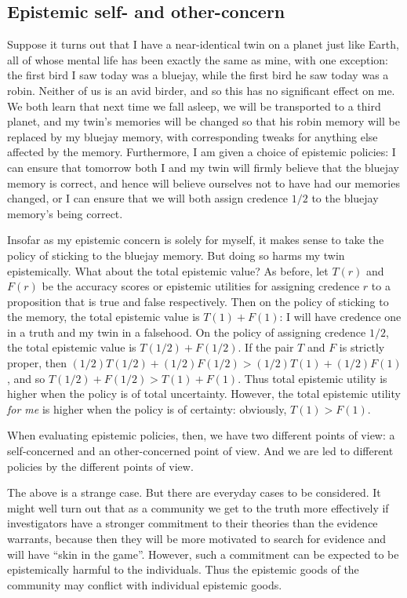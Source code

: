 \subsection{Epistemic self- and other-concern}
Suppose it turns out that I have a near-identical twin on a planet just like Earth, all of whose mental life has been exactly 
the same as mine, with one exception: the first bird I saw today was a bluejay, while the first bird he saw today was a robin. 
Neither of us is an avid birder, and so this has no significant effect on me. We both learn that next time we fall asleep, we 
will be transported to a third planet, and my twin's memories will be changed so that his robin memory will be replaced by my
bluejay memory, with corresponding tweaks for anything else affected by the memory. Furthermore, I am given a choice of epistemic
policies: I can ensure that tomorrow both I and my twin will firmly believe that the bluejay memory is correct, and hence will 
believe ourselves not to have had our memories changed, or I can ensure that we will both assign credence $1/2$ to the bluejay 
memory's being correct. 

Insofar as my epistemic concern is solely for myself, it makes sense to take the policy of sticking to the bluejay memory.
But doing so harms my twin epistemically. What about the total epistemic value? As before, let $T(r)$ and $F(r)$ be the accuracy 
scores or epistemic utilities for assigning credence $r$ to a proposition that is true and false respectively. Then on the policy 
of sticking to the memory, the total epistemic value is $T(1)+F(1)$: I will have credence one in a truth and my twin in a falsehood.
On the policy of assigning credence $1/2$, the total epistemic value is $T(1/2)+F(1/2)$. If the pair $T$ and $F$ is strictly proper,
then $(1/2)T(1/2)+(1/2)F(1/2) > (1/2)T(1)+(1/2)F(1)$, and so $T(1/2)+F(1/2)>T(1)+F(1)$. Thus total epistemic utility is higher
when the policy is of total uncertainty. However, the total epistemic utility \textit{for me} is higher when the policy is of
certainty: obviously, $T(1)>F(1)$. 

When evaluating epistemic policies, then, we have two different points of view: a self-concerned and an other-concerned 
point of view. And we are led to different policies by the different points of view.

The above is a strange case. But there are everyday cases to be considered. It might well turn out that as a community we 
get to the truth more effectively if investigators have a stronger commitment to their theories than the evidence warrants,
because then they will be more motivated to search for evidence and will have ``skin in the game''. However, such a commitment
can be expected to be epistemically harmful to the individuals. Thus the epistemic goods of the community may conflict with 
individual epistemic goods. 

